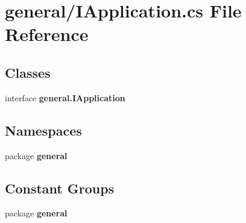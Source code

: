 \section{general/\-I\-Application.cs File Reference}
\label{_i_application_8cs}
\subsection*{Classes}
\begin{DoxyCompactItemize}
\item 
interface {\bf general.\-I\-Application}
\end{DoxyCompactItemize}
\subsection*{Namespaces}
\begin{DoxyCompactItemize}
\item 
package {\bf general}
\end{DoxyCompactItemize}
\subsection*{Constant Groups}
\begin{DoxyCompactItemize}
\item 
package {\bf general}
\end{DoxyCompactItemize}
